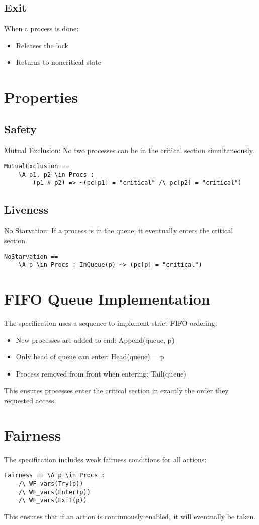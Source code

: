 \documentclass{article}
\begin{document}
\subsection{Exit}
When a process is done:
\begin{itemize}
    \item Releases the lock
    \item Returns to noncritical state
\end{itemize}

\section{Properties}
\subsection{Safety}
Mutual Exclusion: No two processes can be in the critical section simultaneously.
\begin{verbatim}
MutualExclusion ==
    \A p1, p2 \in Procs :
        (p1 # p2) => ~(pc[p1] = "critical" /\ pc[p2] = "critical")
\end{verbatim}

\subsection{Liveness}
No Starvation: If a process is in the queue, it eventually enters the critical section.
\begin{verbatim}
NoStarvation ==
    \A p \in Procs : InQueue(p) ~> (pc[p] = "critical")
\end{verbatim}

\section{FIFO Queue Implementation}
The specification uses a sequence to implement strict FIFO ordering:
\begin{itemize}
    \item New processes are added to end: Append(queue, p)
    \item Only head of queue can enter: Head(queue) = p
    \item Process removed from front when entering: Tail(queue)
\end{itemize}

This ensures processes enter the critical section in exactly the order they requested access.

\section{Fairness}
The specification includes weak fairness conditions for all actions:
\begin{verbatim}
Fairness == \A p \in Procs :
    /\ WF_vars(Try(p))
    /\ WF_vars(Enter(p))
    /\ WF_vars(Exit(p))
\end{verbatim}

This ensures that if an action is continuously enabled, it will eventually be taken.
\end{document}
